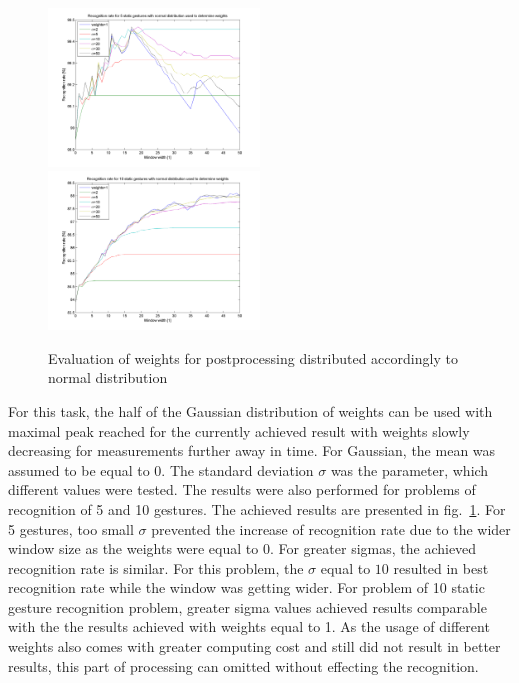 \begin{figure}[htb]
\centering

\centerline{%
 \includegraphics[width=0.5\textwidth]{figures/gaussSum5.png}
 \includegraphics[width=0.5\textwidth]{figures/gaussSum10.png}
 }%
 \caption{Evaluation of weights for postprocessing distributed accordingly to normal distribution}
 \label{staticgauss}
\end{figure}

For this task, the half of the Gaussian distribution of weights can be used with maximal peak reached for the currently achieved result with weights slowly decreasing for measurements further away in time.
For Gaussian, the mean was assumed to be equal to $0$.
The standard deviation $\sigma$ was the parameter, which different values were tested.
The results were also performed for problems of recognition of 5 and 10 gestures.
The achieved results are presented in fig.~\ref{staticgauss}.
For 5 gestures, too small $\sigma$ prevented the increase of recognition rate due to the wider window size as the weights were equal to $0$. 
For greater sigmas, the achieved recognition rate is similar.
For this problem, the $\sigma$ equal to $10$ resulted in best recognition rate while the window was getting wider.
For problem of 10 static gesture recognition problem, greater sigma values achieved results comparable with the the results achieved with weights equal to 1.
As the usage of different weights also comes with greater computing cost and still did not result in better results, this part of processing can omitted without effecting the recognition.


